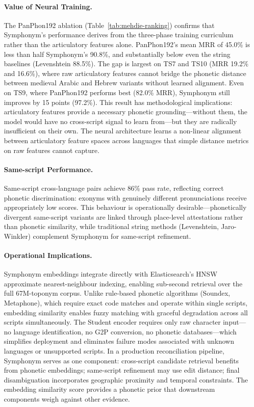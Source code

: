 \documentclass[11pt,a4paper]{article}
\begin{document}
\paragraph{Value of Neural Training.} The PanPhon192 ablation (Table~\ref{tab:mehdie-ranking}) confirms that Symphonym's performance derives from the three-phase training curriculum rather than the articulatory features alone. PanPhon192's mean MRR of 45.0\% is less than half Symphonym's 90.8\%, and substantially below even the string baselines (Levenshtein 88.5\%). The gap is largest on TS7 and TS10 (MRR 19.2\% and 16.6\%), where raw articulatory features cannot bridge the phonetic distance between medieval Arabic and Hebrew variants without learned alignment. Even on TS9, where PanPhon192 performs best (82.0\% MRR), Symphonym still improves by 15 points (97.2\%). This result has methodological implications: articulatory features provide a necessary phonetic grounding---without them, the model would have no cross-script signal to learn from---but they are radically insufficient on their own. The neural architecture learns a non-linear alignment between articulatory feature spaces across languages that simple distance metrics on raw features cannot capture.

\paragraph{Same-script Performance.} Same-script cross-language pairs achieve 86\% pass rate, reflecting correct phonetic discrimination: exonyms with genuinely different pronunciations receive appropriately low scores. This behaviour is operationally desirable---phonetically divergent same-script variants are linked through place-level attestations rather than phonetic similarity, while traditional string methods (Levenshtein, Jaro-Winkler) complement Symphonym for same-script refinement.

\paragraph{Operational Implications.} Symphonym embeddings integrate directly with Elasticsearch's HNSW approximate nearest-neighbour indexing, enabling sub-second retrieval over the full 67M-toponym corpus. Unlike rule-based phonetic algorithms (Soundex, Metaphone), which require exact code matches and operate within single scripts, embedding similarity enables fuzzy matching with graceful degradation across all scripts simultaneously. The Student encoder requires only raw character input---no language identification, no G2P conversion, no phonetic databases---which simplifies deployment and eliminates failure modes associated with unknown languages or unsupported scripts. In a production reconciliation pipeline, Symphonym serves as one component: cross-script candidate retrieval benefits from phonetic embeddings; same-script refinement may use edit distance; final disambiguation incorporates geographic proximity and temporal constraints. The embedding similarity score provides a phonetic prior that downstream components weigh against other evidence.
\end{document}
